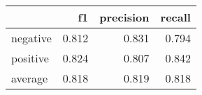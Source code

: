 \begin{tabular}{lrrr}
\toprule
{} &     f1 &  precision &  recall \\
\midrule
negative &  0.812 &      0.831 &   0.794 \\
positive &  0.824 &      0.807 &   0.842 \\
average  &  0.818 &      0.819 &   0.818 \\
\bottomrule
\end{tabular}
